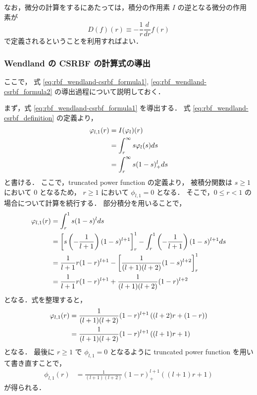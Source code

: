 なお，微分の計算をするにあたっては，積分の作用素 $I$ の逆となる微分の作用素が
\begin{equation}
    D(f)(r) \equiv -\frac{1}{r} \frac{d}{dr} f(r)
\end{equation}
で定義されるということを利用すればよい．

\subsubsection{Wendland の CSRBF の計算式の導出}

ここで，
式 \eqref{eq:rbf_wendland-csrbf_formula1}, \eqref{eq:rbf_wendland-csrbf_formula2}
の導出過程について説明しておく．

まず，式 \eqref{eq:rbf_wendland-csrbf_formula1} を導出する．
式 \eqref{eq:rbf_wendland-csrbf_definition} の定義より，
\begin{align}
    \phi_{l,1} (r)
     & = I (\phi_l) (r)
    \notag                              \\
     & = \int_r^\infty s \phi_l(s) ds
    \notag                              \\
     & = \int_r^\infty s (1 - s)_+^l ds
\end{align}
と書ける．
ここで，truncated power function の定義より，
被積分関数は $s \ge 1$ において 0 となるため，
$r \ge 1$ において $\phi_{l,1} = 0$ となる．
そこで，$0 \le r < 1$ の場合について計算を続行する．
部分積分を用いることで，
\begin{align}
    \phi_{l,1} (r)
     & = \int_r^1 s (1 - s)^l ds
    \notag                                                              \\
     & = \left[ s \left( -\frac{1}{l+1} \right) (1-s)^{l+1} \right]_r^1
    - \int_r^1 \left( -\frac{1}{l+1} \right) (1-s)^{l+1} ds
    \notag                                                              \\
     & = \frac{1}{l+1} r (1-r)^{l+1}
    - \left[ \frac{1}{(l+1)(l+2)} (1-s)^{l+2} \right]_r^1
    \notag                                                              \\
     & = \frac{1}{l+1} r (1-r)^{l+1}
    + \frac{1}{(l+1)(l+2)} (1-r)^{l+2}
\end{align}
となる．式を整理すると，
\begin{align}
    \phi_{l,1} (r)
     & = \frac{1}{(l+1)(l+2)} (1-r)^{l+1}
    \left( (l+2)r + (1-r) \right)
    \notag                                                            \\
     & = \frac{1}{(l+1)(l+2)} (1 - r)^{l+1} \left( (l+1)r + 1 \right)
\end{align}
となる．
最後に $r \ge 1$ で $\phi_{l,1} = 0$ となるように truncated power function を用いて書き直すことで，
\begin{align}
    \phi_{l,1} (r)
     & = \frac{1}{(l+1)(l+2)} (1 - r)_+^{l+1} \left( (l+1)r + 1 \right)
\end{align}
が得られる．

